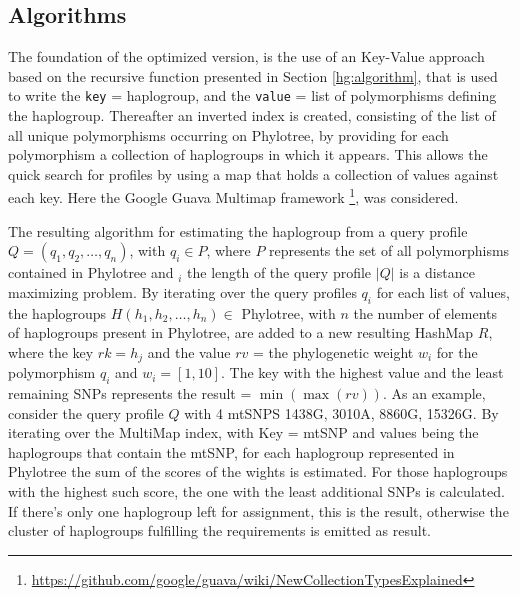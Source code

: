 \subsection{Algorithms}
The foundation of the optimized version, is the use of an Key-Value approach based on the recursive function presented in Section \ref{hg:algorithm}, that is used to write the \texttt{key} = haplogroup, and the \texttt{value} = list of polymorphisms defining the haplogroup. Thereafter an inverted index is created, consisting of the list of all unique polymorphisms occurring on Phylotree, by providing for each polymorphism a collection of haplogroups in which it appears. This allows the quick search for profiles by using a map that holds a collection of values against each key. Here the Google Guava Multimap framework \footnote{\url{https://github.com/google/guava/wiki/NewCollectionTypesExplained}}, was considered.

The resulting algorithm for estimating the haplogroup from a query profile $Q  = \left(q_1,q_2,\dotsc,q_n\right)$, with $q_i \in P$, where $P$ represents the set of all polymorphisms contained in Phylotree and $_i$ the length of the query profile $|Q|$ is a distance maximizing problem. By iterating over the query profiles $q_i$ for each list of values, the haplogroups $H \left(h_1,h_2,\dotsc,h_n\right) \in$ Phylotree, with $n$ the number of elements of haplogroups present in Phylotree, are added to a new resulting HashMap $R$, where the key $rk = h_j$ and the value $rv$ = the phylogenetic weight $w_i$ for the polymorphism $q_i$ and $w_i = \left[1, 10\right]$. The key with the highest value and the least remaining SNPs represents the result = $ \min\left(\max\left(rv\right)\right)$. 
As an example, consider the query profile $Q$ with 4 mtSNPS  1438G, 3010A, 8860G, 15326G. By iterating over the MultiMap index, with Key = mtSNP and values being the haplogroups that contain the mtSNP, for each haplogroup represented in Phylotree the sum of the scores of the wights is estimated. For those haplogroups with the highest such score, the one with the least additional SNPs is calculated. If there's only one haplogroup left for assignment, this is the result, otherwise the cluster of haplogroups fulfilling the requirements is emitted as result.

